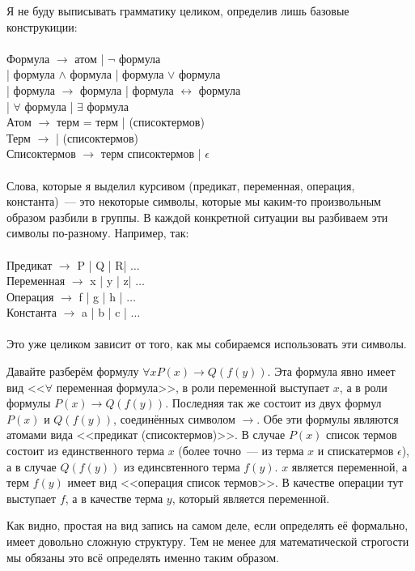 Я не буду выписывать грамматику целиком, определив лишь базовые конструкиции:\\
\\
Формула $\to$ атом | $\neg$ формула\\
\hspace*{2cm}| формула $\land$ формула | формула $\lor$ формула\\
\hspace*{2cm}| формула $\to$ формула | формула $\leftrightarrow$ формула\\
\hspace*{2cm}| $\forall$  формула | $\exists$  формула\\
Атом $\to$ терм = терм |  (списоктермов)\\
Терм $\to$  |  (списоктермов)\\
Списоктермов $\to$ терм списоктермов | $\epsilon$\\
\\
Слова, которые я выделил курсивом (предикат, переменная, операция, константа)~--- это некоторые символы, которые мы каким-то произвольным образом разбили в группы. В каждой конкретной ситуации вы разбиваем эти символы по-разному. Например, так:\\
\\
Предикат $\to$ P | Q | R| $\ldots$\\
Переменная $\to$ x | y | z| $\ldots$\\
Операция $\to$ f | g | h | $\ldots$\\
Константа $\to$ a | b | c | $\ldots$\\
\\
Это уже целиком зависит от того, как мы собираемся использовать эти символы.

\begin{example}
Давайте разберём формулу $\forall x P(x) \to Q(f(y))$. Эта формула явно имеет вид <<$\forall$ переменная формула>>, в роли переменной выступает $x$, а в роли формулы $P(x) \to Q(f(y))$. Последняя так же состоит из двух формул $P(x)$ и $Q(f(y))$, соединённых символом $\to$. Обе эти формулы являются атомами вида <<предикат (списоктермов)>>. В случае $P(x)$ список термов состоит из единственного терма $x$ (более точно~--- из терма $x$ и спискатермов $\epsilon$), а в случае $Q(f(y))$ из единсвтенного терма $f(y)$. $x$ является переменной, а терм $f(y)$ имеет вид <<операция список термов>>. В качестве операции тут выступает $f$, а в качестве терма $y$, который является переменной.
\end{example}

Как видно, простая на вид запись на самом деле, если определять её формально, имеет довольно сложную структуру. Тем не менее для математической строгости мы обязаны это всё определять именно таким образом.